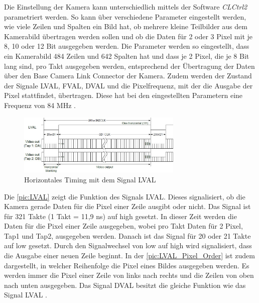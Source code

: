 \documentclass[ngerman,12pt]{article} %
\begin{document}
{Die Einstellung der Kamera kann unterschiedlich mittels der Software \textit{CLCtrl2} parametriert werden. So kann über verschiedene Parameter eingestellt werden, wie viele Zeilen und Spalten ein Bild hat, ob mehrere kleine Teilbilder aus dem Kamerabild übertragen werden sollen und ob die Daten für 2 oder 3 Pixel mit je 8, 10 oder 12 Bit ausgegeben werden. Die Parameter werden so eingestellt, dass ein Kamerabild 484 Zeilen und 642 Spalten hat und dass je 2 Pixel, die je 8 Bit lang sind, pro Takt ausgegeben werden, entsprechend der Übertragung der Daten über den Base Camera Link Connector der Kamera. Zudem werden der Zustand der Signale  LVAL, FVAL, DVAL und die Pixelfrequenz, mit der die Ausgabe der Pixel stattfindet, übertragen. Diese hat bei den eingestellten Parametern eine Frequenz von 84 MHz \cite{Sentech}.\newline

\begin{figure} [h!tb]
	\begin{center}
	\includegraphics[width=0.7\textwidth]{LVAL_neu}
	\caption[Horizontales Timing mit dem Signal LVAL]{\label{pic:LVAL}Horizontales Timing mit dem Signal LVAL \cite{Sentech}}
	\end{center}
\end{figure}

Die \autoref{pic:LVAL} zeigt die Funktion des Signals LVAL. Dieses signalisiert, ob die Kamera gerade Daten für die Pixel einer Zeile ausgibt oder nicht. Das Signal ist für 321 Takte (1 Takt = 11,9 ns) auf high gesetzt. In dieser Zeit werden die Daten für die Pixel einer Zeile ausgegeben, wobei pro Takt Daten für 2 Pixel, Tap1 und Tap2, ausgegeben werden. Danach ist das Signal für 20 oder 21 Takte auf low gesetzt. Durch den Signalwechsel von low auf high wird signalisiert, dass die Ausgabe einer neuen Zeile beginnt. In der \autoref{pic:LVAL_Pixel_Order} ist zudem dargestellt, in welcher Reihenfolge die Pixel eines Bildes ausgegeben werden. Es werden immer die Pixel einer Zeile von links nach rechts und die Zeilen von oben nach unten ausgegeben. Das Signal DVAL besitzt die gleiche Funktion wie das Signal LVAL \cite{Sentech}.\newline

}
\end{document}
